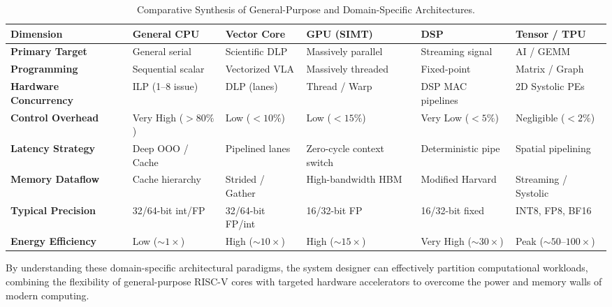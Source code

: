 \begin{table}[htbp]
  \begin{center}
    \caption{Comparative Synthesis of General-Purpose and Domain-Specific Architectures.}
    \label{tab:dsa_comparison}
    \small
    \begin{tabular}{|l|l|l|l|l|l|}
      \hline
      \textbf{Dimension} & \textbf{General CPU} & \textbf{Vector Core} & \textbf{GPU (SIMT)} & \textbf{DSP} & \textbf{Tensor / TPU} \\ \hline \hline
      \textbf{Primary Target} & General serial & Scientific DLP & Massively parallel & Streaming signal & AI / GEMM \\ \hline
      \textbf{Programming}    & Sequential scalar & Vectorized VLA & Massively threaded & Fixed-point & Matrix / Graph \\ \hline
      \textbf{Hardware Concurrency} & ILP (1--8 issue) & DLP (lanes) & Thread / Warp & DSP MAC pipelines & 2D Systolic PEs \\ \hline
      \textbf{Control Overhead}     & Very High ($>80\%$) & Low ($<10\%$) & Low ($<15\%$) & Very Low ($<5\%$) & Negligible ($<2\%$) \\ \hline
      \textbf{Latency Strategy}     & Deep OOO / Cache & Pipelined lanes & Zero-cycle context switch & Deterministic pipe & Spatial pipelining \\ \hline
      \textbf{Memory Dataflow}      & Cache hierarchy & Strided / Gather & High-bandwidth HBM & Modified Harvard & Streaming / Systolic \\ \hline
      \textbf{Typical Precision}    & 32/64-bit int/FP & 32/64-bit FP/int & 16/32-bit FP & 16/32-bit fixed & INT8, FP8, BF16 \\ \hline
      \textbf{Energy Efficiency}    & Low ($\sim 1\times$) & High ($\sim 10\times$) & High ($\sim 15\times$) & Very High ($\sim 30\times$) & Peak ($\sim 50\text{--}100\times$) \\ \hline
    \end{tabular}
  \end{center}
\end{table}

By understanding these domain-specific architectural paradigms, the system designer can effectively partition computational workloads, combining the flexibility of general-purpose RISC-V cores with targeted hardware accelerators to overcome the power and memory walls of modern computing.
